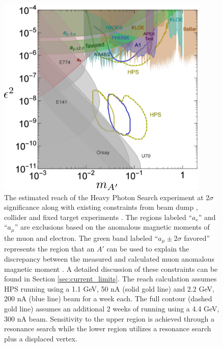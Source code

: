 \begin{figure}[h!t]
    \centering
    \includegraphics[width=0.90\textwidth]{images/ap_current_constraints.png}
    \caption{The estimated reach of the Heavy Photon Search experiment at 
             2$\sigma$ significance along with existing constraints from 
             beam dump  
             \cite{Bjorken:1988as, riordan1987, bross1991, konaka1986,
                   davier1989, Bjorken:2009mm, andreas2012, Blumlein:1990ay,
                   Blumlein:1991xh, johannes2011, johannes2014},  
             collider 
             \cite{Reece:2009un, Aubert:2009cp, Babusci:2012cr, Archilli:2011zc} 
             and fixed target experiments 
             \cite{Abrahamyan:2011gv, Merkel:2014avp, Agakishiev:2013fwl,
                   Batley:2015lha}.
             The regions labeled ``$a_e$'' and ``$a_\mu$'' are exclusions based
             on the anomalous magnetic moments of the muon and electron.
             The green band labeled ``$a_{\mu} \pm 2\sigma$ favored'' represents
             the region that an $A'$ can be used to explain the discrepancy 
             between the measured and calculated muon anomalous magnetic moment
             \cite{Pospelov:2008zw, Bennet:2006fi}.
             A detailed discussion of these constraints can be found in Section 
             \ref{sec:current_limits}.
             The reach calculation assumes HPS running using a 1.1 GeV, 50 nA 
             (solid gold line) and 2.2 GeV, 200 nA (blue line) beam for a week each.  The
             full contour (dashed gold line) assumes an additional 2 weeks of running 
             using a 4.4 GeV, 300 nA beam.
             Sensitivity to the upper region is achieved through a resonance search while
            the lower region utilizes a resonance search plus a displaced vertex.
    }
    \label{fig:ap_limits}
\end{figure}

